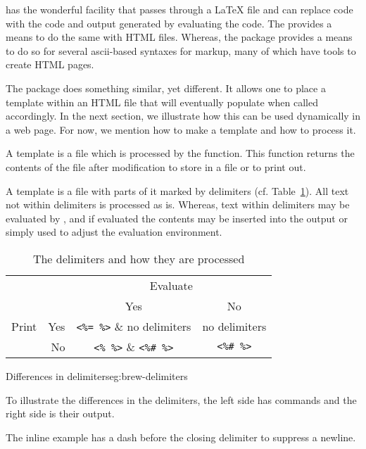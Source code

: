 \R\/ has the wonderful facility  that passes through a
\LaTeX\/ file and can replace \R\/ code with the code and output
generated by evaluating the code. The  provides a means to
do the same with HTML files. Whereas, the  package provides
a means to do so for several ascii-based syntaxes for markup, many of
which have tools to create HTML pages.

The  package does something similar, yet different. It
allows one to place a template within an HTML file that \R\/ will
eventually populate when called accordingly. In the next section, we
illustrate how this can be used dynamically in a web page. For now, we
mention how to make a template and how to process it.

A template is a file which is processed by the 
function. This function returns the contents of the file after
modification to store in a file or to print out.

A template is a file with parts of it marked by delimiters
(cf. Table~\ref{tab:brew-delimiters}). All text not within delimiters
is processed as is. Whereas, text within delimiters may be evaluated
by \R, and if evaluated the contents may be inserted into the output
or simply used to adjust the evaluation environment.


\begin{table}
  \centering
  \begin{tabular}{lr@{\quad}c@{\quad}c}
    \toprule
    &&\multicolumn{2}{c}{Evaluate}\\
    && Yes & No \\
    \cmidrule{3-4}
   Print & Yes & \verb+<%= %>+ & no delimiters\\
          & No  & \verb+<% %>+  & \verb+<%# %>+\\
\bottomrule
 \end{tabular}
  \caption{The  delimiters and how they are processed}
  \label{tab:brew-delimiters}
\end{table}


\begin{example}{Differences in  delimiters}{eg:brew-delimiters}

To illustrate the differences in the  delimiters, the left
side has  commands and the right side is their output.

\begin{minipage}{0.45\linewidth}
\end{minipage}
\quad\quad
\begin{minipage}{0.45\linewidth}
\end{minipage}

The inline example has a dash before the closing delimiter to suppress
a newline.
\end{example}

